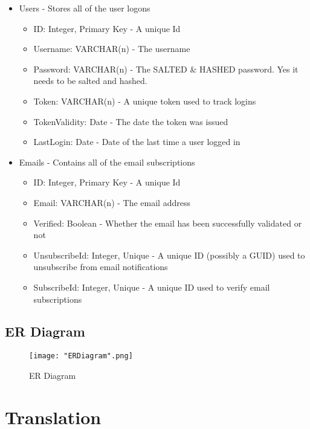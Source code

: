 \documentclass{scrreprt}
\begin{document}
\begin{itemize}
        \item Users - Stores all of the user logons
        \begin{itemize}
            \item ID: Integer, Primary Key - A unique Id
            \item Username: VARCHAR(n) - The username
            \item Password: VARCHAR(n) - The SALTED & HASHED password. Yes it needs to be salted and hashed.
            \item Token: VARCHAR(n) - A unique token used to track logins
            \item TokenValidity: Date - The date the token was issued
            \item LastLogin: Date - Date of the last time a user logged in            
        \end{itemize}
        
        \item Emails - Contains all of the email subscriptions
        \begin{itemize}
            \item ID: Integer, Primary Key - A unique Id
            \item Email: VARCHAR(n) - The email address
            \item Verified: Boolean - Whether the email has been successfully validated or not
            \item UnsubscribeId: Integer, Unique - A unique ID (possibly a GUID) used to unsubscribe from email notifications
            \item SubscribeId: Integer, Unique - A unique ID used to verify email subscriptions
        \end{itemize}
    \end{itemize}
        
    \subsection{ER Diagram}
    
\begin{figure}[H]
\caption{ER Diagram}
\centering
\texttt{[image: "ERDiagram".png]}
\end{figure}    
    
    \section{Translation}
    
\end{document}
